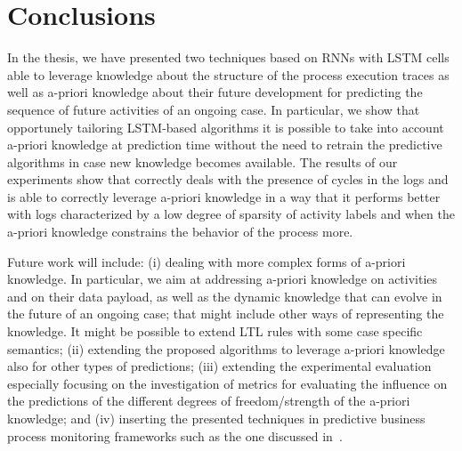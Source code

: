 
\section{Conclusions} %
\label{sec:conclusions}

In the thesis, we have presented two techniques based on RNNs with LSTM cells able to leverage knowledge about the structure of the process execution traces as well as a-priori knowledge about their future development for predicting the sequence of future activities of an ongoing case. In particular, we show that opportunely tailoring LSTM-based algorithms it is possible to take into account a-priori knowledge at prediction time without the need to retrain the predictive algorithms in case new knowledge becomes available. The results of our experiments show that \nocycle correctly deals with the presence of cycles in the logs and \protrack is able to correctly leverage a-priori knowledge in a way that it performs better with logs characterized by a low degree of sparsity of activity labels and when the a-priori knowledge constrains the behavior of the process more.

Future work will include: (i) dealing with more complex forms of a-priori knowledge. In particular, we aim at addressing a-priori knowledge on activities and on their data payload, as well as the dynamic knowledge that can evolve in the future of an ongoing case; that might include other ways of representing the knowledge. It might be possible to extend LTL rules with some case specific semantics;  (ii) extending the proposed algorithms to leverage a-priori knowledge also for other types of predictions; (iii) extending the experimental evaluation especially focusing on the investigation of metrics for evaluating the influence on the predictions of the different degrees of freedom/strength of the a-priori knowledge; and (iv) inserting the presented techniques in predictive business process monitoring frameworks such as the one discussed in~\cite{Di-Francescomarino:2016aa}. 

\newpage

